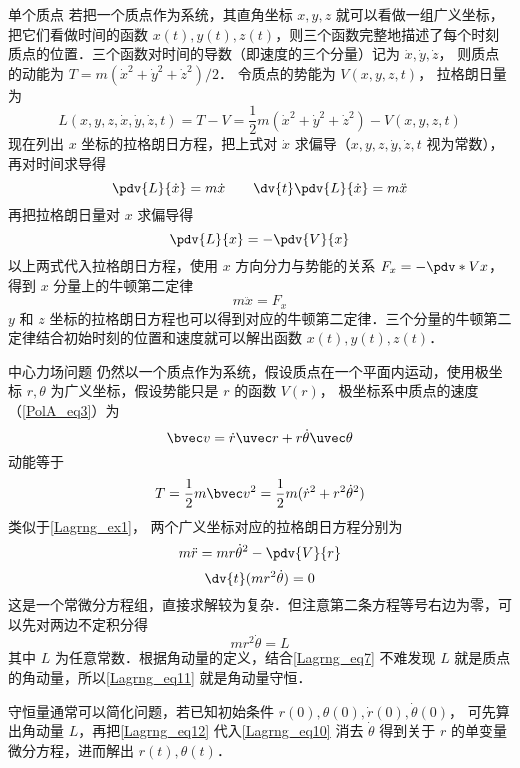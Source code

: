 \begin{example}{单个质点}\label{Lagrng_ex1}
若把一个质点作为系统，其直角坐标 $x,y,z$ 就可以看做一组广义坐标，把它们看做时间的函数 $x(t), y(t), z(t)$，则三个函数完整地描述了每个时刻质点的位置．三个函数对时间的导数（即速度的三个分量）记为 $\dot x, \dot y, \dot z$， 则质点的动能为 $T=m(\dot x^2+\dot y^2+\dot z^2)/2$． 令质点的势能为 $V(x,y,z,t)$， 拉格朗日量为
\begin{equation}
L(x,y,z, \dot x, \dot y, \dot z, t) = T-V = \frac12 m(\dot x^2+\dot y^2+\dot z^2) - V(x,y,z,t)
\end{equation}
现在列出 $x$ 坐标的拉格朗日方程，把上式对 $\dot x$ 求偏导（$x, y,z, \dot y, \dot z, t$ 视为常数），再对时间求导得
\begin{equation}
\pdv{L}{\dot x} = m\dot x
\qquad
\dv{t} \pdv{L}{\dot x} = m\ddot x
\end{equation}
再把拉格朗日量对 $x$ 求偏导得
\begin{equation}
\pdv{L}{x} = -\pdv{V}{x}
\end{equation}
以上两式代入拉格朗日方程，使用 $x$ 方向分力与势能的关系 $F_x = -\pdv*{V}{x}$， 得到 $x$ 分量上的牛顿第二定律
\begin{equation}
m\ddot x = F_x
\end{equation}
$y$ 和 $z$ 坐标的拉格朗日方程也可以得到对应的牛顿第二定律．三个分量的牛顿第二定律结合初始时刻的位置和速度就可以解出函数 $x(t), y(t), z(t)$． 
\end{example}

\begin{example}{中心力场问题}
仍然以一个质点作为系统，假设质点在一个平面内运动，使用极坐标 $r, \theta$ 为广义坐标，假设势能只是 $r$ 的函数 $V(r)$， 极坐标系中质点的速度（\autoref{PolA_eq3}）为
\begin{equation}\label{Lagrng_eq7}
\bvec v = \dot r\uvec r + r\dot \theta \uvec \theta
\end{equation}
动能等于
\begin{equation}
T = \frac12 m\bvec v^2 = \frac12 m(\dot r^2 + r^2 \dot \theta^2)
\end{equation}
类似于\autoref{Lagrng_ex1}， 两个广义坐标对应的拉格朗日方程分别为
\begin{equation}\label{Lagrng_eq10}
m\ddot r = mr \dot \theta^2 - \pdv{V}{r}
\end{equation}
\begin{equation}\label{Lagrng_eq11}
\dv{t} (m r^2\dot \theta)  = 0
\end{equation}
这是一个常微分方程组，直接求解较为复杂．但注意第二条方程等号右边为零，可以先对两边不定积分得
\begin{equation}\label{Lagrng_eq12}
mr^2\dot\theta = L
\end{equation}
其中 $L$ 为任意常数．根据角动量的定义，结合\autoref{Lagrng_eq7} 不难发现 $L$ 就是质点的角动量，所以\autoref{Lagrng_eq11} 就是角动量守恒．

守恒量通常可以简化问题，若已知初始条件 $r(0), \theta (0), \dot r(0), \dot\theta (0)$， 可先算出角动量 $L$，再把\autoref{Lagrng_eq12} 代入\autoref{Lagrng_eq10} 消去 $\dot\theta$ 得到关于 $r$ 的单变量微分方程，进而解出 $r(t), \theta (t)$．
\end{example}

